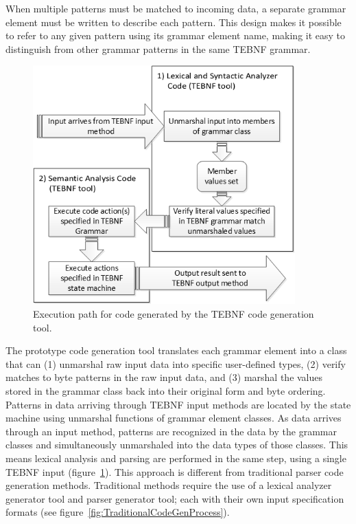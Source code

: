 \indent
When multiple patterns must be matched to incoming data, a separate grammar element must be written to describe each pattern.  This design makes it possible to refer to any given pattern using its grammar element name, making it easy to distinguish from other grammar patterns in the same TEBNF grammar.

\begin{figure}[htbp]
\centering
\includegraphics[width=0.9\textwidth]{figures/GeneratedCodeExecutionPath.png}
\caption{Execution path for code generated by the TEBNF code generation tool.}
\label{fig:GeneratedCodeExecutionPath}
\end{figure}

\indent
The prototype code generation tool translates each grammar element into a class that can (1) unmarshal raw input data into specific user-defined types, (2) verify matches to byte patterns in the raw input data, and (3) marshal the values stored in the grammar class back into their original form and byte ordering.  Patterns in data arriving through TEBNF input methods are located by the state machine using unmarshal functions of grammar element classes.  As data arrives through an input method, patterns are recognized in the data by the grammar classes and simultaneously unmarshaled into the data types of those classes.  This means lexical analysis and parsing are performed in the same step, using a single TEBNF input (figure~\ref{fig:GeneratedCodeExecutionPath}).  This approach is different from traditional parser code generation methods.  Traditional methods require the use of a lexical analyzer generator tool and parser generator tool; each with their own input specification formats (see figure~\ref{fig:TraditionalCodeGenProcess}).

